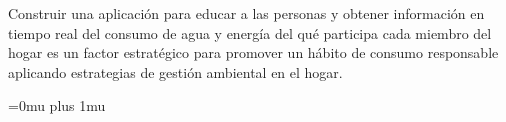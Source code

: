 \documentclass[a4paper,man,natbib]{apa6}
\begin{document}
Construir una aplicación para educar a las personas y obtener información en tiempo real del consumo de agua y energía del qué participa cada miembro del hogar es un factor estratégico para promover un hábito de consumo responsable aplicando estrategias de gestión ambiental en el hogar.

\nocite{*}

\Urlmuskip=0mu plus 1mu\relax


\end{document}
